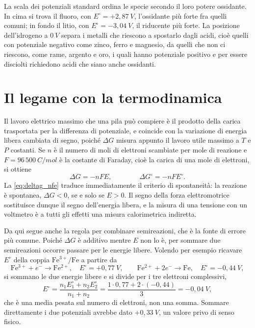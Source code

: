 La scala dei potenziali standard ordina le specie secondo il loro potere ossidante.
In cima si trova il fluoro, con $E^\circ = +2{,}87 \ V$, l'ossidante più forte fra quelli comuni; in fondo il litio, con $E^\circ = -3{,}04 \ V$, il riducente più forte.
La posizione dell'idrogeno a $0 \ V$ separa i metalli che riescono a spostarlo dagli acidi, cioè quelli con potenziale negativo come zinco, ferro e magnesio, da quelli che non ci riescono, come rame, argento e oro, i quali hanno potenziale positivo e per essere disciolti richiedono acidi che siano anche ossidanti.
 
\section{Il legame con la termodinamica}
 
Il lavoro elettrico massimo che una pila può compiere è il prodotto della carica trasportata per la differenza di potenziale, e coincide con la variazione di energia libera cambiata di segno, poiché $\Delta G$ misura appunto il lavoro utile massimo a $T$ e $P$ costanti.
Se $n$ è il numero di moli di elettroni scambiate per mole di reazione e $F = 96\,500 \ C/mol$ è la costante di Faraday, cioè la carica di una mole di elettroni, si ottiene
\begin{equation}
    \Delta G = -nFE ,
    \qquad\qquad
    \Delta G^\circ = -nFE^\circ .
    \label{eq:deltag_nfe}
\end{equation}
La \eqref{eq:deltag_nfe} traduce immediatamente il criterio di spontaneità: la reazione è spontanea, $\Delta G < 0$, se e solo se $E > 0$.
Il segno della forza elettromotrice sostituisce dunque il segno dell'energia libera, e la misura di una tensione con un voltmetro è a tutti gli effetti una misura calorimetrica indiretta.
 
Da qui segue anche la regola per combinare semireazioni, che è la fonte di errore più comune.
Poiché $\Delta G$ è additivo mentre $E$ non lo è, per sommare due semireazioni occorre passare per le energie libere.
Volendo per esempio ricavare $E^\circ$ della coppia $\mathrm{Fe^{3+}}/\mathrm{Fe}$ a partire da
\[
    \mathrm{Fe^{3+}} + e^- \longrightarrow \mathrm{Fe^{2+}} , \quad E^\circ = +0{,}77 \ V ,
    \qquad
    \mathrm{Fe^{2+}} + 2e^- \longrightarrow \mathrm{Fe} , \quad E^\circ = -0{,}44 \ V ,
\]
si sommano le due energie libere e si divide per i tre elettroni complessivi,
\begin{equation}
    E^\circ = \frac{n_1 E^\circ_1 + n_2 E^\circ_2}{n_1 + n_2}
    = \frac{1 \cdot 0{,}77 + 2 \cdot (-0{,}44)}{3} = -0{,}04 \ V ,
    \label{eq:combinazione_potenziali}
\end{equation}
che è una media pesata sul numero di elettroni, non una somma.
Sommare direttamente i due potenziali avrebbe dato $+0{,}33 \ V$, un valore privo di senso fisico.
 
